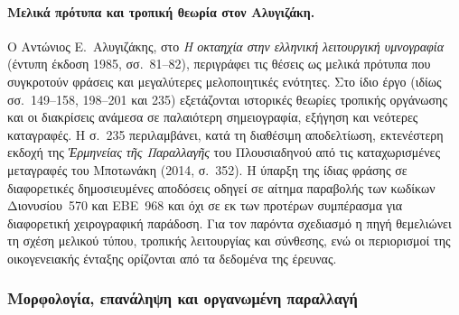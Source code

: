 \documentclass[11pt,a4paper]{article}
\begin{document}
\paragraph{Μελικά πρότυπα και τροπική θεωρία στον Αλυγιζάκη.}
Ο Αντώνιος Ε.~Αλυγιζάκης, στο \emph{Η οκταηχία στην ελληνική λειτουργική υμνογραφία} (έντυπη έκδοση 1985, σσ.~81--82), περιγράφει τις θέσεις ως μελικά πρότυπα που συγκροτούν φράσεις και μεγαλύτερες μελοποιητικές ενότητες. Στο ίδιο έργο (ιδίως σσ.~149--158, 198--201 και 235) εξετάζονται ιστορικές θεωρίες τροπικής οργάνωσης και οι διακρίσεις ανάμεσα σε παλαιότερη σημειογραφία, εξήγηση και νεότερες καταγραφές. Η σ.~235 περιλαμβάνει, κατά τη διαθέσιμη αποδελτίωση, εκτενέστερη εκδοχή της \emph{Ἑρμηνείας τῆς Παραλλαγῆς} του Πλουσιαδηνού από τις καταχωρισμένες μεταγραφές του Μποτωνάκη (2014, σ.~352). Η ύπαρξη της ίδιας φράσης σε διαφορετικές δημοσιευμένες αποδόσεις οδηγεί σε αίτημα παραβολής των κωδίκων Διονυσίου~570 και ΕΒΕ~968 και όχι σε εκ των προτέρων συμπέρασμα για διαφορετική χειρογραφική παράδοση. Για τον παρόντα σχεδιασμό η πηγή θεμελιώνει τη σχέση μελικού τύπου, τροπικής λειτουργίας και σύνθεσης, ενώ οι περιορισμοί της οικογενειακής ένταξης ορίζονται από τα δεδομένα της έρευνας.

\subsubsection{Μορφολογία, επανάληψη και οργανωμένη παραλλαγή}
\end{document}
